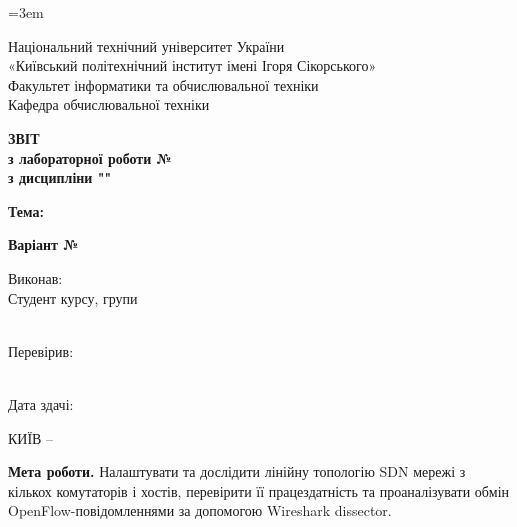 \documentclass[14pt, a4paper]{extreport}
\begin{document}
	\emergencystretch=3em
	
	\begin{titlepage}
		\begin{center}
			{Національний технічний університет України\\
				«Київський політехнічний інститут імені Ігоря Сікорського» \\[1.0em] }
			{Факультет інформатики та обчислювальної техніки\\}
			{Кафедра обчислювальної техніки \\[5.0em]}
			
			{\textbf{ЗВІТ}\\[1em]}
			{\textbf{з лабораторної роботи №\LabNumber} \\}
			{\textbf{з дисципліни "\CourseTitle"} \\[2.0em]}
			
			{\textbf{Тема: \Topic} \\[2.0em]}
			
			{\textbf{Варіант №\Variant} \\[5.0em]}
			
			\begin{flushright}
				Виконав: \\
				Студент \CourseNumber{} курсу, групи \StudentGroup \\
				\StudentName \\[2.0em]
			\end{flushright}
			
			\begin{flushright}
				Перевірив: \\
				\Teacher \\[2.0em]
			\end{flushright}
			
			\begin{flushright}
				Дата здачі: \SubmissionDate \\[5.0em]
			\end{flushright}
		
			\vfill
			КИЇВ -- \Year
		\end{center}
	\end{titlepage}
	
	\setlength{\parindent}{1.25cm}
	
	\textbf{Мета роботи.} Налаштувати та дослідити лінійну топологію SDN мережі з кількох комутаторів і хостів, перевірити її працездатність та проаналізувати обмін OpenFlow-повідомленнями за допомогою Wireshark dissector.
	
\end{document}
